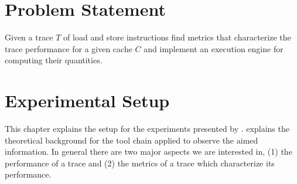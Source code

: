 \documentclass[onecolumn, openright, master, english, signatures]{dbrgrptt}
\begin{document}


\chapter{Problem Statement}\label{cha:problems-tatement}
\begin{definition}
Given a \ac{trace} $T$ of load and store instructions find metrics that characterize the trace performance for a given cache $C$ and implement an execution engine for computing their quantities.
\end{definition}


\chapter{Experimental Setup}\label{cha:experimental-setup}

This chapter explains the setup for the experiments presented by .  explains the theoretical background for the tool chain applied to observe the aimed information. In general there are two major aspects we are interested in, (1) the performance of a \ac{trace} and (2) the metrics of a \ac{trace} which characterize its performance.

\end{document}
